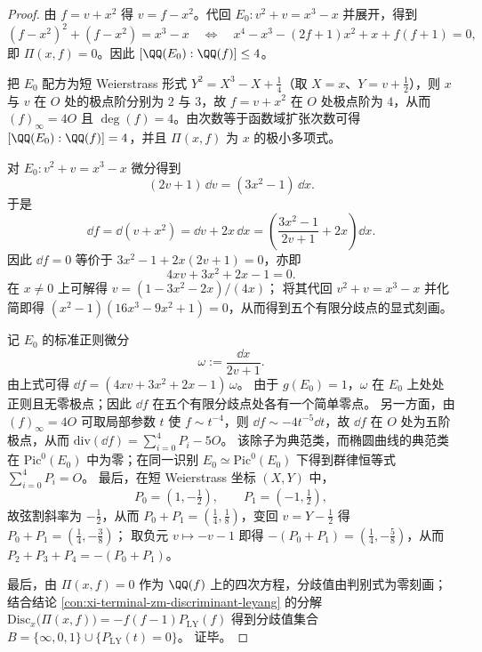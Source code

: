 \begin{proof}
由 \(f=v+x^2\) 得 \(v=f-x^2\)。代回 \(E_0:v^2+v=x^3-x\) 并展开，得到
\[
(f-x^2)^2+(f-x^2)=x^3-x
\quad\Longleftrightarrow\quad
x^{4}-x^{3}-(2f+1)x^{2}+x+f(f+1)=0,
\]
即 \(\Pi(x,f)=0\)。因此 \([\QQ(E_0):\QQ(f)]\le 4\)。
\par
把 \(E_0\) 配方为短 Weierstrass 形式 \(Y^2=X^3-X+\tfrac14\)（取 \(X=x\)、\(Y=v+\tfrac12\)），则 \(x\) 与 \(v\) 在 \(O\) 处的极点阶分别为 \(2\) 与 \(3\)，故 \(f=v+x^2\) 在 \(O\) 处极点阶为 \(4\)，从而 \((f)_\infty=4O\) 且 \(\deg(f)=4\)。由次数等于函数域扩张次数可得 \([\QQ(E_0):\QQ(f)]=4\)，并且 \(\Pi(x,f)\) 为 \(x\) 的极小多项式。
\par
对 \(E_0:v^2+v=x^3-x\) 微分得到
\[
(2v+1)\,\dd v=(3x^2-1)\,\dd x.
\]
于是
\[
\dd f=\dd(v+x^2)=\dd v+2x\,\dd x=\left(\frac{3x^2-1}{2v+1}+2x\right)\dd x.
\]
因此 \(\dd f=0\) 等价于 \(3x^2-1+2x(2v+1)=0\)，亦即
\[
4xv+3x^2+2x-1=0.
\]
在 \(x\neq 0\) 上可解得 \(v=(1-3x^2-2x)/(4x)\)；
将其代回 \(v^2+v=x^3-x\) 并化简即得 \((x^2-1)(16x^3-9x^2+1)=0\)，从而得到五个有限分歧点的显式刻画。
\par
记 \(E_0\) 的标准正则微分
\[
\omega:=\frac{\dd x}{2v+1}.
\]
由上式可得 \(\dd f=(4xv+3x^2+2x-1)\,\omega\)。
由于 \(g(E_0)=1\)，\(\omega\) 在 \(E_0\) 上处处正则且无零极点；因此 \(\dd f\) 在五个有限分歧点处各有一个简单零点。
另一方面，由 \((f)_\infty=4O\) 可取局部参数 \(t\) 使 \(f\sim t^{-4}\)，则 \(\dd f\sim -4t^{-5}\dd t\)，故 \(\dd f\) 在 \(O\) 处为五阶极点，从而 \(\mathrm{div}(\dd f)=\sum_{i=0}^{4}P_i-5O\)。
该除子为典范类，而椭圆曲线的典范类在 \(\mathrm{Pic}^0(E_0)\) 中为零；在同一识别 \(E_0\simeq \mathrm{Pic}^0(E_0)\) 下得到群律恒等式 \(\sum_{i=0}^4 P_i=O\)。
最后，在短 Weierstrass 坐标 \((X,Y)\) 中，
\[
P_0=(1,-\tfrac12),\qquad P_1=(-1,\tfrac12),
\]
故弦割斜率为 \(-\tfrac12\)，从而 \(P_0+P_1=(\tfrac14,\tfrac18)\)，变回 \(v=Y-\tfrac12\) 得
\(
P_0+P_1=(\tfrac14,-\tfrac38)
\)；
取负元 \(v\mapsto -v-1\) 即得
\(
-(P_0+P_1)=(\tfrac14,-\tfrac58)
\)，从而 \(P_2+P_3+P_4=-(P_0+P_1)\)。
\par
最后，由 \(\Pi(x,f)=0\) 作为 \(\QQ(f)\) 上的四次方程，分歧值由判别式为零刻画；结合结论 \ref{con:xi-terminal-zm-discriminant-leyang} 的分解
\(
\mathrm{Disc}_{x}\bigl(\Pi(x,f)\bigr)=-f(f-1)P_{\mathrm{LY}}(f)
\)
得到分歧值集合 \(B=\{\infty,0,1\}\cup\{P_{\mathrm{LY}}(t)=0\}\)。
证毕。
\end{proof}
\par

